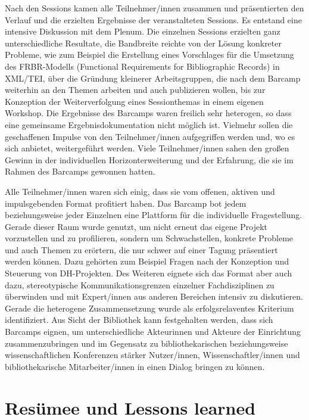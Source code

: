 \documentclass[a4paper,
fontsize=11pt,
oneside,
numbers=noperiodatend,
parskip=half-,
bibliography=totoc,
final
]{scrartcl}
\begin{document}
Nach den Sessions kamen alle Teilnehmer/innen zusammen und präsentierten
den Verlauf und die erzielten Ergebnisse der veranstalteten Sessions. Es
entstand eine intensive Diskussion mit dem Plenum. Die einzelnen
Sessions erzielten ganz unterschiedliche Resultate, die Bandbreite
reichte von der Lösung konkreter Probleme, wie zum Beispiel die
Erstellung eines Vorschlages für die Umsetzung des FRBR-Modells
(Functional Requirements for Bibliographic Records) in XML/TEI, über die
Gründung kleinerer Arbeitsgruppen, die nach dem Barcamp weiterhin an den
Themen arbeiten und auch publizieren wollen, bis zur Konzeption der
Weiterverfolgung eines Sessionthemas in einem eigenen Workshop. Die
Ergebnisse des Barcamps waren freilich sehr heterogen, so dass eine
gemeinsame Ergebnisdokumentation nicht möglich ist. Vielmehr sollen die
geschaffenen Impulse von den Teilnehmer/innen aufgegriffen werden und,
wo es sich anbietet, weitergeführt werden. Viele Teilnehmer/innen sahen
den großen Gewinn in der individuellen Horizonterweiterung und der
Erfahrung, die sie im Rahmen des Barcamps gewonnen hatten.

Alle Teilnehmer/innen waren sich einig, dass sie vom offenen, aktiven
und impulsgebenden Format profitiert haben. Das Barcamp bot jedem
beziehungsweise jeder Einzelnen eine Plattform für die individuelle
Fragestellung. Gerade dieser Raum wurde genutzt, um nicht erneut das
eigene Projekt vorzustellen und zu profilieren, sondern um
Schwachstellen, konkrete Probleme und auch Themen zu erörtern, die nur
schwer auf einer Tagung präsentiert werden können. Dazu gehörten zum
Beispiel Fragen nach der Konzeption und Steuerung von DH-Projekten. Des
Weiteren eignete sich das Format aber auch dazu, stereotypische
Kommunikationsgrenzen einzelner Fachdisziplinen zu überwinden und mit
Expert/innen aus anderen Bereichen intensiv zu diskutieren. Gerade die
heterogene Zusammensetzung wurde als erfolgsrelaventes Kriterium
identifiziert. Aus Sicht der Bibliothek kann festgehalten werden, dass
sich Barcamps eignen, um unterschiedliche Akteurinnen und Akteure der
Einrichtung zusammenzubringen und im Gegensatz zu bibliothekarischen
beziehungsweise wissenschaftlichen Konferenzen stärker Nutzer/innen,
Wissenschaftler/innen und bibliothekarische Mitarbeiter/innen in einen
Dialog bringen zu können.

\hypertarget{resuxfcmee-und-lessons-learned}{%
\section{Resümee und Lessons
learned}\label{resuxfcmee-und-lessons-learned}}
\end{document}
